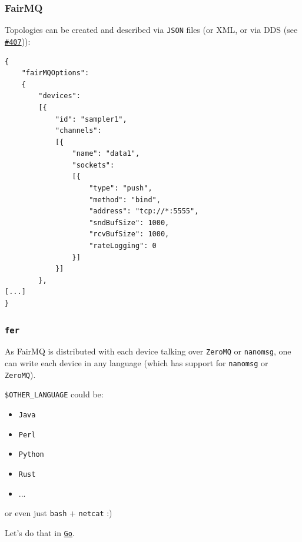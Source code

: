 \documentclass[9pt]{beamer}
\newcommand{\myblue} [1] {{\color{blue}#1}}
\begin{document}
\begin{frame}[fragile]
\frametitle{FairMQ}


Topologies can be created and described via \texttt{JSON} files (or XML, or via DDS (see \myblue{\href{https://indico.cern.ch/event/587955/timetable/?view=standard\#407-dds-the-dynamic-deployment}{\texttt{\#407}}})):


\begin{verbatim}
{
    "fairMQOptions":
    {
        "devices":
        [{
            "id": "sampler1",
            "channels":
			[{
                "name": "data1",
                "sockets":
				[{
                    "type": "push",
                    "method": "bind",
                    "address": "tcp://*:5555",
                    "sndBufSize": 1000,
                    "rcvBufSize": 1000,
                    "rateLogging": 0
                }]
            }]
        },
[...]
}

\end{verbatim}


\end{frame}

\begin{frame}[fragile]
	\frametitle{\tt{fer}}


As FairMQ is distributed with each device talking over \texttt{ZeroMQ} or \texttt{nanomsg}, one can write each device in any language (which has support for \texttt{nanomsg} or \texttt{ZeroMQ}).


\texttt{\$OTHER\_LANGUAGE} could be:


\begin{itemize}
\item \texttt{Java}
\item \texttt{Perl}
\item \texttt{Python}
\item \texttt{Rust}
\item ... 
\end{itemize}

or even just \texttt{bash} + \texttt{netcat} :)


Let's do that in \myblue{\href{https://golang.org}{\texttt{Go}}}.



\end{frame}
\end{document}
